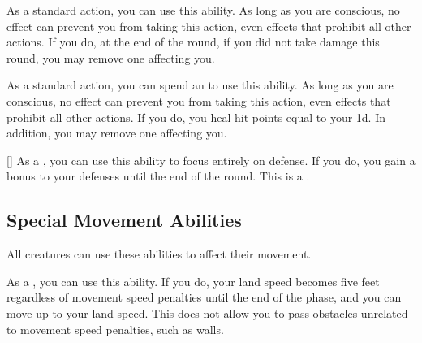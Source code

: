         \begin{ability}{}
            As a standard action, you can use this ability.
            As long as you are conscious, no effect can prevent you from taking this action, even effects that prohibit all other actions.
            If you do, at the end of the round, if you did not take damage this round, you may remove one  affecting you.
        \end{ability}

        \begin{ability}{}
            As a standard action, you can spend an  to use this ability.
            As long as you are conscious, no effect can prevent you from taking this action, even effects that prohibit all other actions.
            If you do, you heal hit points equal to your  \minus1d.
            In addition, you may remove one  affecting you.
        \end{ability}

        \begin{ability}{}[]
            As a , you can use this ability to focus entirely on defense.
            If you do, you gain a  bonus to your defenses until the end of the round.
            This is a .
        \end{ability}

    \subsection{Special Movement Abilities}

        All creatures can use these abilities to affect their movement.

        \begin{ability}{}
            As a , you can use this ability.
            If you do, your land speed becomes five feet regardless of movement speed penalties until the end of the phase, and you can move up to your land speed.
            This does not allow you to pass obstacles unrelated to movement speed penalties, such as walls.
        \end{ability}


